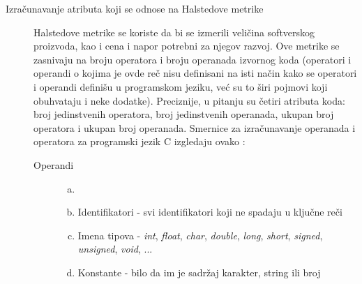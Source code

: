 \documentclass[12pt,oneside]{memoir}
\begin{document}
\begin{description}
\item[Izračunavanje atributa koji se odnose na Halstedove metrike]

Halstedove metrike se koriste da bi se izmerili veličina softverskog proizvoda, kao i cena i napor potrebni za njegov razvoj. Ove metrike se zasnivaju na broju operatora i broju operanada izvornog koda (operatori i operandi o kojima je ovde reč nisu definisani na isti način kako se operatori i operandi definišu u programskom jeziku, već su to širi pojmovi koji obuhvataju
i neke dodatke). Preciznije, u pitanju su četiri atributa koda: broj jedinstvenih operatora, broj jedinstvenih operanada, ukupan broj operatora i ukupan broj operanada.  Smernice za izračunavanje operanada i operatora za programski jezik C izgledaju ovako \cite{halstead}:
\begin{description}
\item[Operandi]
	\begin{enumerate}[(a)]
		\item[]
		\item Identifikatori - svi identifikatori koji ne spadaju u ključne reči
		\item Imena tipova - \textit{int}, \textit{float}, \textit{char}, \textit{double}, \textit{long}, \textit{short}, \textit{signed}, \textit{unsigned}, \textit{void}, ... 
		\item Konstante - bilo da im je sadržaj karakter, string ili broj
	\end{enumerate}


\end{description}
\end{description}
\end{document}
